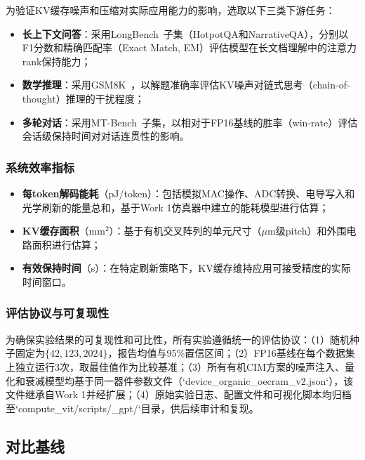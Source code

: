 为验证KV缓存噪声和压缩对实际应用能力的影响，选取以下三类下游任务：

\begin{itemize}
    \item \textbf{长上下文问答}：采用LongBench~\cite{bai2023longbench}子集（HotpotQA和NarrativeQA），分别以F1分数和精确匹配率（Exact Match, EM）评估模型在长文档理解中的注意力rank保持能力；
    \item \textbf{数学推理}：采用GSM8K~\cite{cobbe2021training}，以解题准确率评估KV噪声对链式思考（chain-of-thought）推理的干扰程度；
    \item \textbf{多轮对话}：采用MT-Bench~\cite{zheng2023judging}子集，以相对于FP16基线的胜率（win-rate）评估会话级保持时间对对话连贯性的影响。
\end{itemize}

\subsubsection{系统效率指标}

\begin{itemize}
    \item \textbf{每token解码能耗}（pJ/token）：包括模拟MAC操作、ADC转换、电导写入和光学刷新的能量总和，基于Work 1仿真器中建立的能耗模型进行估算；
    \item \textbf{KV缓存面积}（mm$^2$）：基于有机交叉阵列的单元尺寸（$\mu$m级pitch）和外围电路面积进行估算；
    \item \textbf{有效保持时间}（s）：在特定刷新策略下，KV缓存维持应用可接受精度的实际时间窗口。
\end{itemize}

\subsubsection{评估协议与可复现性}

为确保实验结果的可复现性和可比性，所有实验遵循统一的评估协议：（1）随机种子固定为$\{42, 123, 2024\}$，报告均值与95\%置信区间；（2）FP16基线在每个数据集上独立运行3次，取最佳值作为比较基准；（3）所有有机CIM方案的噪声注入、量化和衰减模型均基于同一器件参数文件（`device_organic_oecram_v2.json`），该文件继承自Work 1并经扩展；（4）原始实验日志、配置文件和可视化脚本均归档至`compute_vit/scripts/_gpt/`目录，供后续审计和复现。

\subsection{对比基线}


